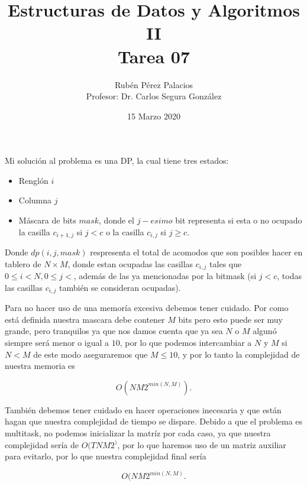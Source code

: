\documentclass[letterpaper]{article}
\title{Estructuras de Datos y Algoritmos II\\Tarea 07}
\author{Rubén Pérez Palacios\\Profesor: Dr. Carlos Segura González}
\date{15 Marzo 2020}
\theoremstyle{definition}
\theoremstyle{lemathm}
\theoremstyle{lemademthm}
\begin{document}
  \maketitle

  Mi solución al problema es una DP, la cual tiene tres estados:

  \begin{itemize}
    \item Renglón $i$
    \item Columna $j$
    \item Máscara de bits $mask$, donde el $j-esimo$ bit representa si esta o no ocupado la casilla $c_{i+1,j}$ si $j < c$ o la casilla $c_{i,j}$ si $j \geq c$.
  \end{itemize}

  Donde $dp(i,j,mask)$ respresenta el total de acomodos que son posibles hacer en tablero de $N \times M$, donde estan ocupadas las casillas $c_{i,j}$ tales que $0 \leq i < N, 0 \leq j < $, además de las ya mencionadas por la bitmask (si $j < c$, todas las casillas $c_{i,j}$ también se consideran ocupadas).

  Para no hacer uso de una memoría excesiva debemos tener cuidado. Por como está definida nuestra mascara debe contener $M$ bits pero esto puede ser muy grande, pero tranquilos ya que nos damos cuenta que ya sea $N$ o $M$ algunó siempre será menor o igual a $10$, por lo que podemos intercambiar a $N$ y $M$ si $N < M$ de este modo aseguraremos que $M \leq 10$, y por lo tanto la complejidad de nuestra memoria es

  \[O(NM2^{min(N,M)}).\]
   
  También debemos tener cuidado en hacer operaciones inecesaria y que están hagan que nuestra complejidad de tiempo se dispare. Debido a que el problema es multitask, no podemos inicializar la matríz por cada caso, ya que nuestra complejidad sería de $O(TNM2^)$, por lo que haremos uso de un matriz auxiliar para evitarlo, por lo que nuestra complejidad final sería

  \[O(NM2^{min(N,M)}.\]
\end{document}
